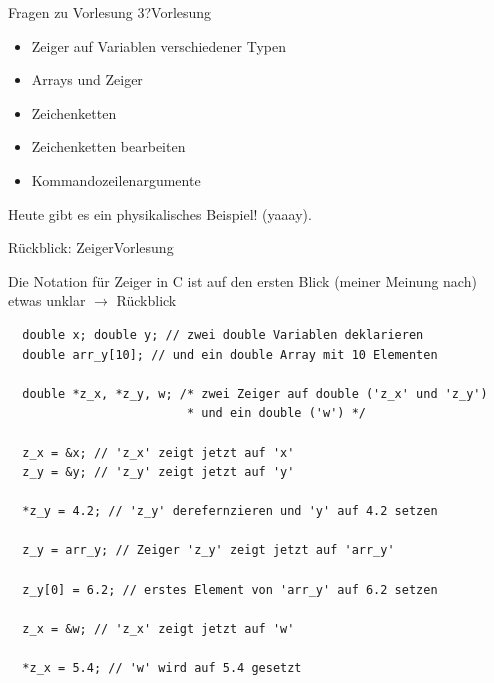\documentclass[xcolor=dvipsnames]{beamer}
\newcounter{lecturecounter}
\begin{document}

\begin{frame}[fragile]{Fragen zu Vorlesung 3?}{Vorlesung }
  \begin{itemize}
    \item{Zeiger auf Variablen verschiedener Typen}
    \item{Arrays und Zeiger}
    \item{Zeichenketten}
    \item{Zeichenketten bearbeiten}
    \item{Kommandozeilenargumente}
  \end{itemize}
  \vspace{0.5cm}
  Heute gibt es ein physikalisches Beispiel! (yaaay).
\end{frame}

\begin{frame}[fragile]{Rückblick: Zeiger}{Vorlesung }
\begin{block}{}
Die Notation für Zeiger in C ist auf den ersten Blick (meiner Meinung nach) etwas unklar $\rightarrow$ Rückblick
\end{block}
\begin{lstlisting}
  double x; double y; // zwei double Variablen deklarieren
  double arr_y[10]; // und ein double Array mit 10 Elementen
  
  double *z_x, *z_y, w; /* zwei Zeiger auf double ('z_x' und 'z_y')
                         * und ein double ('w') */
   
  z_x = &x; // 'z_x' zeigt jetzt auf 'x'
  z_y = &y; // 'z_y' zeigt jetzt auf 'y'
  
  *z_y = 4.2; // 'z_y' derefernzieren und 'y' auf 4.2 setzen
  
  z_y = arr_y; // Zeiger 'z_y' zeigt jetzt auf 'arr_y'
  
  z_y[0] = 6.2; // erstes Element von 'arr_y' auf 6.2 setzen
  
  z_x = &w; // 'z_x' zeigt jetzt auf 'w'
  
  *z_x = 5.4; // 'w' wird auf 5.4 gesetzt
\end{lstlisting}
  
\end{frame}
\end{document}
